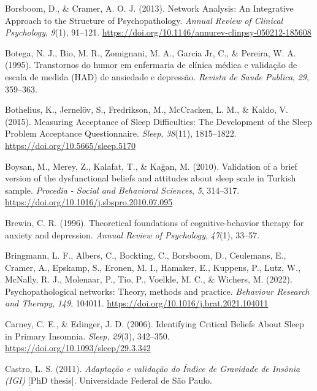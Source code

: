 \documentclass[
  ,doc,11pt, twoside,floatsintext]{apa6}
\newlength{\cslhangindent}
\newlength{\cslentryspacingunit} %
\newenvironment{CSLReferences}[2] %
 {%
  \setlength{\parindent}{0pt}
  \ifodd #1
  \let\oldpar\par
  \def\par{\hangindent=\cslhangindent\oldpar}
  \fi
  \setlength{\parskip}{#2\cslentryspacingunit}
 }%
 {}
\begin{document}
\begin{CSLReferences}{1}{0}
\leavevmode{}%
Borsboom, D., \& Cramer, A. O. J. (2013). Network {Analysis}: {An Integrative Approach} to the {Structure} of {Psychopathology}. \emph{Annual Review of Clinical Psychology}, \emph{9}(1), 91--121. \url{https://doi.org/10.1146/annurev-clinpsy-050212-185608}

\leavevmode{}%
Botega, N. J., Bio, M. R., Zomignani, M. A., Garcia Jr, C., \& Pereira, W. A. (1995). Transtornos do humor em enfermaria de clínica médica e validação de escala de medida (HAD) de ansiedade e depressão. \emph{Revista de Saude Publica}, \emph{29}, 359--363.

\leavevmode{}%
Bothelius, K., Jernelöv, S., Fredrikson, M., McCracken, L. M., \& Kaldo, V. (2015). Measuring {Acceptance} of {Sleep Difficulties}: {The Development} of the {Sleep Problem Acceptance Questionnaire}. \emph{Sleep}, \emph{38}(11), 1815--1822. \url{https://doi.org/10.5665/sleep.5170}

\leavevmode{}%
Boysan, M., Merey, Z., Kalafat, T., \& Kağan, M. (2010). Validation of a brief version of the dysfunctional beliefs and attitudes about sleep scale in {Turkish} sample. \emph{Procedia - Social and Behavioral Sciences}, \emph{5}, 314--317. \url{https://doi.org/10.1016/j.sbspro.2010.07.095}

\leavevmode{}%
Brewin, C. R. (1996). Theoretical foundations of cognitive-behavior therapy for anxiety and depression. \emph{Annual Review of Psychology}, \emph{47}(1), 33--57.

\leavevmode{}%
Bringmann, L. F., Albers, C., Bockting, C., Borsboom, D., Ceulemans, E., Cramer, A., Epskamp, S., Eronen, M. I., Hamaker, E., Kuppens, P., Lutz, W., McNally, R. J., Molenaar, P., Tio, P., Voelkle, M. C., \& Wichers, M. (2022). Psychopathological networks: {Theory}, methods and practice. \emph{Behaviour Research and Therapy}, \emph{149}, 104011. \url{https://doi.org/10.1016/j.brat.2021.104011}

\leavevmode{}%
Carney, C. E., \& Edinger, J. D. (2006). Identifying {Critical Beliefs About Sleep} in {Primary Insomnia}. \emph{Sleep}, \emph{29}(3), 342--350. \url{https://doi.org/10.1093/sleep/29.3.342}

\leavevmode{}%
Castro, L. S. (2011). \emph{Adaptação e validação do {Índice} de {Gravidade} de {Insônia} ({IGI})} {[}PhD thesis{]}. Universidade Federal de São Paulo.


\end{CSLReferences}
\end{document}
